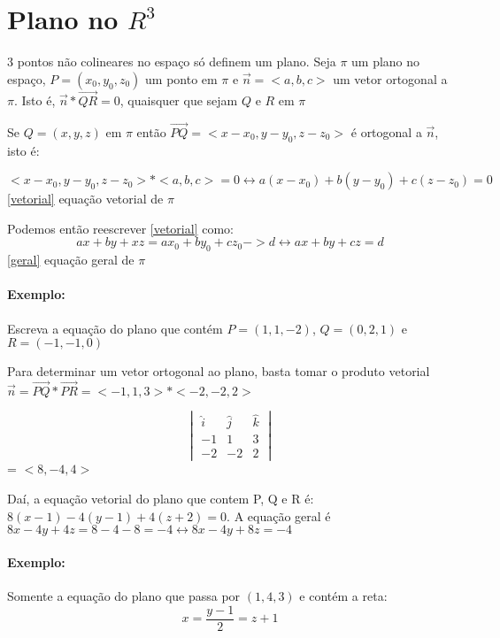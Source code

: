 \date{22-10-2024}

\section{Plano no $R^3$}

3 pontos não colineares no espaço só definem um plano. Seja $\pi$ um plano no espaço, $P=(x_0, y_0, z_0)$ um ponto em
$\pi$ e $\overrightarrow{n} = < a,b,c >$ um vetor ortogonal a $\pi$. Isto é, $\overrightarrow{n} * \overrightarrow{QR} = 0$, quaisquer que sejam $Q$ e $R$ em $\pi$


Se $Q = (x,y,z)$ em $\pi$ então $\overrightarrow{PQ} = < x-x_0, y-y_0, z-z_0 >$ é ortogonal a $\overrightarrow{n}$, isto é: 

\begin{equation}\label{vetorial}
    < x- x_0, y- y_0, z - z_0 > * <a,b,c> = 0 \leftrightarrow a(x-x_0) + b(y-y_0) + c (z-z_0) = 0
\end{equation}
\eqref{vetorial} equação vetorial de $\pi$

Podemos então reescrever \eqref{vetorial} como: 
\begin{equation}\label{geral}
    ax + by + xz = ax_0 + by_0 + cz_0 -> d \leftrightarrow ax + by + cz = d
\end{equation}
\eqref{geral} equação geral de $\pi$

\paragraph{Exemplo:}
Escreva a equação do plano que contém $P = (1,1,-2)$, $Q = (0,2,1)$ e $R = (-1,-1,0)$


Para determinar um vetor ortogonal ao plano, basta tomar o produto vetorial $\overrightarrow{n} = \overrightarrow{PQ} * \overrightarrow{PR} = <-1,1,3> * <-2,-2,2>$

\[
\begin{vmatrix}
    \hat{i} & \hat{j} & \hat{k} \\ 
    -1 & 1 & 3 \\ 
    -2 & -2 & 2 
\end{vmatrix}
\] = $<8,-4,4>$

Daí, a equação vetorial do plano que contem P, Q e R é: $8(x-1) - 4(y-1) + 4(z+2) = 0$.
A equação geral é $8x-4y+4z = 8-4-8 = -4 \leftrightarrow 8x - 4y + 8z = -4$

\paragraph{Exemplo:} Somente a equação do plano que passa por $(1,4,3)$ e contém a reta:
\begin{equation}
    x = \frac{y-1}{2} = z+1 
\end{equation}

